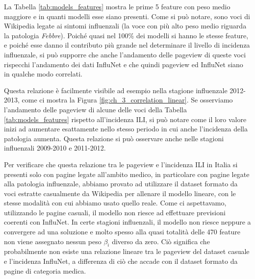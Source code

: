La Tabella \ref{tab:models_features} mostra le prime 5 feature con peso medio maggiore e in quanti modelli 
esse siano presenti. Come si può notare, sono voci di Wikipedia legate ai sintomi influenzali (la voce con più alto 
peso medio riguarda la patologia \textit{Febbre}). Poiché quasi nel 100\% dei modelli si hanno le stesse feature, e poiché 
esse danno il contributo più grande nel determinare il livello di incidenza influenzale, si può supporre che anche 
l'andamento delle pageview di queste voci rispecchi l'andamento dei dati InfluNet e che quindi pageview ed InfluNet siano in 
qualche modo correlati.
\bigskip

Questa relazione è facilmente visibile ad esempio nella stagione influenzale 2012-2013, come ci mostra la Figura 
\ref{fig:ch_3_correlation_linear}. Se osserviamo l'andamento delle pageview di alcune delle voci della Tabella 
\ref{tab:models_features} rispetto all'incidenza ILI, si può notare come il loro valore inizi ad aumentare esattamente 
nello stesso periodo in cui anche l'incidenza della patologia aumenta. Questa relazione si può osservare anche nelle stagioni 
influenzali 2009-2010 e 2011-2012.
\bigskip

Per verificare che questa relazione tra le pageview e l'incidenza ILI in Italia si presenti solo con pagine legate all'ambito 
medico, in particolare con pagine legate alla patologia influenzale, abbiamo provato ad 
utilizzare il dataset formato da voci estratte casualmente da Wikipedia per allenare il modello lineare, con le stesse 
modalità con cui abbiamo usato quello reale. Come ci aspettavamo, utilizzando le pagine casuali, il modello non riesce ad 
effettuare previsioni coerenti con InfluNet. In certe stagioni influenzali, il modello non riesce neppure a convergere ad una 
soluzione e molto spesso alla quasi totalità delle 470 feature non viene assegnato nessun peso $\beta_i$ diverso da zero. Ciò 
significa che probabilmente non esiste una relazione lineare tra le pageview del dataset casuale e l'incidenza InfluNet, a 
differenza di ciò che accade con il dataset formato da pagine di categoria medica.
\bigskip

